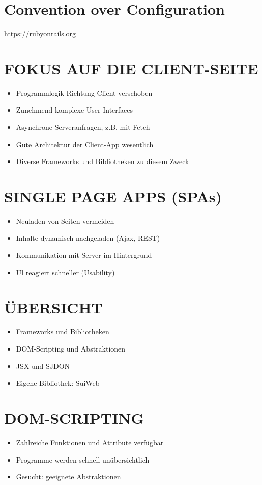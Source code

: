\section*{Convention over Configuration}
\href{https://rubyonrails.org}{https://rubyonrails.org}

\section*{FOKUS AUF DIE CLIENT-SEITE}
\begin{itemize}
  \item Programmlogik Richtung Client verschoben
  \item Zunehmend komplexe User Interfaces
  \item Asynchrone Serveranfragen, z.B. mit Fetch
  \item Gute Architektur der Client-App wesentlich
  \item Diverse Frameworks und Bibliotheken zu diesem Zweck
\end{itemize}

\section*{SINGLE PAGE APPS (SPAs)}
\begin{itemize}
  \item Neuladen von Seiten vermeiden
  \item Inhalte dynamisch nachgeladen (Ajax, REST)
  \item Kommunikation mit Server im Hintergrund
  \item Ul reagiert schneller (Usability)
\end{itemize}

\section*{ÜBERSICHT}
\begin{itemize}
  \item Frameworks und Bibliotheken
  \item DOM-Scripting und Abstraktionen
  \item JSX und SJDON
  \item Eigene Bibliothek: SuiWeb
\end{itemize}

\section*{DOM-SCRIPTING}
\begin{itemize}
  \item Zahlreiche Funktionen und Attribute verfügbar
  \item Programme werden schnell unübersichtlich
  \item Gesucht: geeignete Abstraktionen
\end{itemize}

